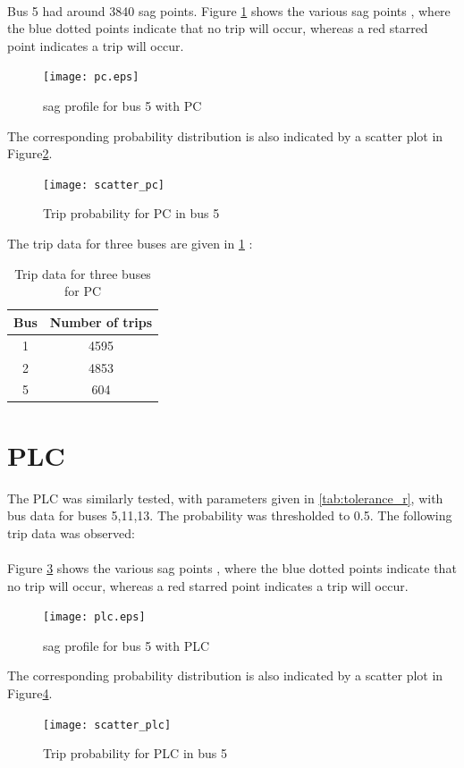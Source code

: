 \documentclass[17pt,a4paper]{extreport}
\begin{document}
	\paragraph{ } Bus 5 had around 3840 sag points. Figure \ref{fig:pc_sag_5} shows the various sag points , where the blue dotted points indicate that no trip will occur, whereas a red starred point indicates a trip will occur.
	\begin{figure}[!h]
		\texttt{[image: pc.eps]}
		\caption{sag profile for bus 5 with PC}
		\label{fig:pc_sag_5}
	\end{figure}
	The corresponding probability distribution is also indicated by a scatter plot in Figure\ref{fig:scatter_pc_5}.
	\begin{figure}[!h]
	\texttt{[image: scatter\_pc]}
	\caption{ Trip probability for PC in bus 5}
	\label{fig:scatter_pc_5}
\end{figure}	
 The trip data for three buses are given in \ref{tab:PC_res} :
 \begin{center}
 \begin{table}
 \centering
 \caption{Trip data for three buses for PC}
 \begin{tabular}{|c|c|}
 \hline 
 Bus & Number of trips \\ \hline
 1 & 4595 \\ \hline
 2 & 4853 \\ \hline
 5 & 604	\\ \hline
 
 \end{tabular}
 \label{tab:PC_res}
 \end{table}
 
 \end{center}

\newpage \section[PLC]{PLC}
	The PLC was similarly tested, with parameters given in \ref{tab:tolerance_r}, with bus data for buses 5,11,13. The probability was thresholded to 0.5. The following trip data was observed:
	\paragraph{} Figure \ref{fig:plc_sag_5} shows the various sag points , where the blue dotted points indicate that no trip will occur, whereas a red starred point indicates a trip will occur.
	\begin{figure}[!h]
		\texttt{[image: plc.eps]}
		\caption{sag profile for bus 5 with PLC}
		\label{fig:plc_sag_5}
	\end{figure}
	The corresponding probability distribution is also indicated by a scatter plot in Figure\ref{fig:scatter_plc_5}.
	\begin{figure}[h]
	\texttt{[image: scatter\_plc]}
	\caption{Trip probability for PLC in bus 5}
	\label{fig:scatter_plc_5}
\end{figure}
\end{document}

